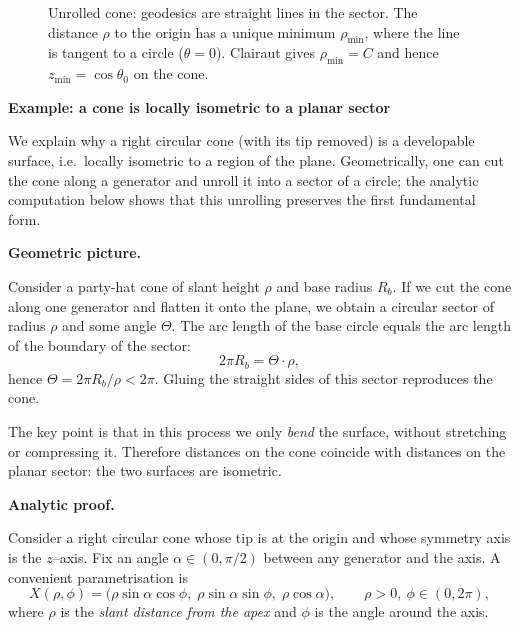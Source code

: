 \begin{solution}
\begin{figure}[htbp]
\begin{tikzpicture}[scale=2]
	\end{tikzpicture}
	\caption{Unrolled cone: geodesics are straight lines in the sector.
		The distance $\rho$ to the origin has a unique minimum $\rho_{\min}$,
		where the line is tangent to a circle ($\theta=0$). Clairaut gives
		$\rho_{\min} = C$ and hence $z_{\min} = \cos\theta_0$ on the cone.}
\end{figure}
	
	\par\medskip\noindent\textbf{Example: a cone is locally isometric to a planar sector}\par\smallskip

	
	We explain why a right circular cone (with its tip removed) is a developable
	surface, i.e.\ locally isometric to a region of the plane.  Geometrically, one
	can cut the cone along a generator and unroll it into a sector of a circle; the
	analytic computation below shows that this unrolling preserves the first
	fundamental form.
	
	\par\medskip\noindent\textbf{Geometric picture.}\par\smallskip

	Consider a party-hat cone of slant height $\rho$ and base radius $R_b$.  If we
	cut the cone along one generator and flatten it onto the plane, we obtain a
	circular sector of radius $\rho$ and some angle $\Theta$.  The arc length of
	the base circle equals the arc length of the boundary of the sector:
	\[
	2\pi R_b = \Theta\cdot\rho,
	\]
	hence $\Theta = 2\pi R_b/\rho < 2\pi$.  Gluing the straight sides of this
	sector reproduces the cone.
	
	The key point is that in this process we only \emph{bend} the surface, without
	stretching or compressing it.  Therefore distances on the cone coincide with
	distances on the planar sector: the two surfaces are isometric.
	
	\par\medskip\noindent\textbf{Analytic proof.}\par\smallskip

	Consider a right circular cone whose tip is at the origin and whose symmetry
	axis is the $z$--axis.  Fix an angle $\alpha\in(0,\pi/2)$ between any generator
	and the axis.  A convenient parametrisation is
	\[
	X(\rho,\phi)
	= \bigl(\rho\sin\alpha\cos\phi,\;
	\rho\sin\alpha\sin\phi,\;
	\rho\cos\alpha\bigr),
	\qquad \rho>0,\ \phi\in(0,2\pi),
	\]
	where $\rho$ is the \emph{slant distance from the apex} and $\phi$ is the angle
	around the axis.
	

\end{solution}
